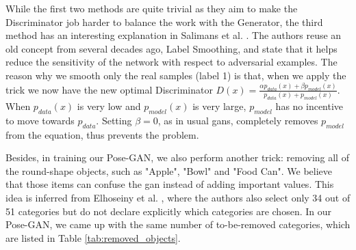 While the first two methods are quite trivial as they aim to make the Discriminator job
harder to balance the work with the Generator, the third method has an interesting
explanation in Salimans et al. \cite{saliman}. The authors reuse an old concept from
several decades ago, Label Smoothing, and state that it helps reduce the sensitivity of
the network with respect to adversarial examples. The reason why we smooth only the real
samples (label 1) is that, when we apply the trick we now have the new optimal
Discriminator $D(x) = \frac{\alpha p_{data}(x) + \beta p_{model}(x)}{p_{data}(x) +
p_{model}(x)}$. When $p_{data}(x)$ is very low and $p_{model}(x)$ is very large,
$p_{model}$ has no incentive to move towards $p_{data}$. Setting $\beta = 0$, as in usual
\acrshort{gan}s, completely removes $p_{model}$ from the equation, thus prevents the
problem.

Besides, in training our Pose-GAN, we also perform another trick: removing all of the
round-shape objects, such as "Apple", "Bowl" and "Food Can". We believe that those items can
confuse the \acrshort{gan} instead of adding important values. This idea is inferred from
Elhoseiny et al. \cite{elhoseiny}, where the authors also select only 34 out of 51
categories but do not declare explicitly which categories are chosen. In our
Pose-GAN, we came up with the same number of to-be-removed categories, which are listed in
Table \ref{tab:removed_objects}.

